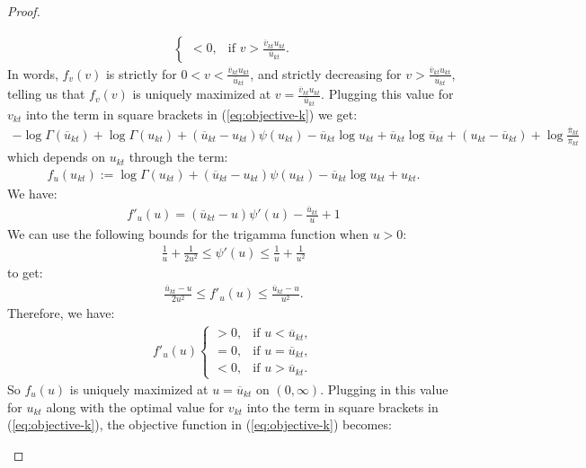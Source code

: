 \begin{proof}
\begin{enumerate}[label=\roman*.]
\begin{align*}
\begin{cases}
        < 0, & \text{if } v > \frac{\overline{v}_{kt} u_{kt}}{\overline{u}_{kt}}.
    \end{cases}
\end{align*}
In words, $f_v(v)$ is strictly for $0<v < \frac{\overline{v}_{kt} u_{kt}}{\overline{u}_{kt}}$, and strictly decreasing for $v > \frac{\overline{v}_{kt} u_{kt}}{\overline{u}_{kt}}$, telling us that $f_v(v)$ is uniquely maximized at $v = \frac{\overline{v}_{kt} u_{kt}}{\overline{u}_{kt}}$. Plugging this value for $v_{kt}$ into the term in square brackets in (\ref{eq:objective-k}) we get:
\begin{align*}
    -  \log\Gamma(\overline{u}_{kt}) + \log\Gamma(u_{kt}) + \left(\overline{u}_{kt} -u_{kt}\right)\psi(u_{kt}) - \overline{u}_{kt} \log u_{kt} + \overline{u}_{kt} \log\overline{u}_{kt}  + \left(u_{kt}- \overline{u}_{kt}\right) + \log \frac{\overline{\pi}_{kt}}{\pi_{kt}}
\end{align*}
which depends on $u_{kt}$ through the term:
\begin{align*}
    f_u(u_{kt}) := \log\Gamma(u_{kt}) + \left(\overline{u}_{kt} -u_{kt}\right)\psi(u_{kt}) - \overline{u}_{kt} \log u_{kt} + u_{kt}.
\end{align*}
We have:
\begin{align*}
    f'_u(u) = \left(\overline{u}_{kt} -u\right)\psi'(u) - \frac{\overline{u}_{kt}}{u} + 1
\end{align*}
We can use the following bounds for the trigamma function when $u>0$:
\begin{align*}
    \frac{1}{u} + \frac{1}{2u^2} \leq \psi'(u) \leq \frac{1}{u} + \frac{1}{u^2}
\end{align*}
to get:
\begin{align*}
    \frac{\overline{u}_{kt} -u}{2u^2} \leq f'_u(u) \leq \frac{\overline{u}_{kt} -u}{u^2}.
\end{align*}
Therefore, we have:
\begin{align*}
f'_u(u)
    \begin{cases}
        > 0, & \text{if } u < \overline{u}_{kt}, \\ 
        = 0, & \text{if } u = \overline{u}_{kt}, \\  
        < 0, & \text{if } u > \overline{u}_{kt}.
    \end{cases}
\end{align*}
So $f_u(u)$ is uniquely maximized at $u = \overline{u}_{kt}$ on $(0,\infty)$. Plugging in this value for $u_{kt}$ along with the optimal value for $v_{kt}$ into the term in square brackets in (\ref{eq:objective-k}), the objective function in (\ref{eq:objective-k}) becomes:

\end{enumerate}
\end{proof}
